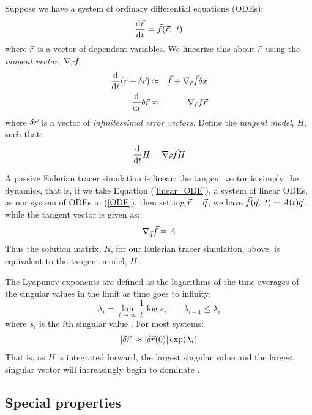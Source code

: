 \documentclass{article}
\begin{document}
Suppose we have a system of ordinary differential equations (ODEs):
\begin{equation}
	\frac{\mathrm d \vec r}{\mathrm d t} = \vec f(\vec r, ~ t)
	\label{ODE}
\end{equation}
where $\vec r$ is a vector of dependent variables.
We linearize this about $\vec r$ using the {\it tangent vector},
$\nabla_{\vec r} f$:
\begin{eqnarray}
\frac{\mathrm d}{\mathrm d t} (\vec r + \delta \vec r) & \approx & \vec f + 
	\nabla_{\vec r} \vec f \delta \vec x \\
	\frac{\mathrm d}{\mathrm d t} \delta \vec r & \approx & \nabla_{\vec r} \vec f \vec r
\end{eqnarray}
where $\delta \vec r$ is a vector of {\it infinitessimal error vectors}.
Define the {\it tangent model}, $H$, such that:
\begin{equation} 
	\frac{\mathrm d}{\mathrm d t} H = \nabla_{\vec r} \vec f H \\
\end{equation}

A passive Eulerian tracer simulation is linear: the tangent vector is simply
the dynamics, that is,
if we take Equation (\ref{linear_ODE}), a system of linear ODEs,
as our system of ODEs in
(\ref{ODE}), then setting $\vec r=\vec q$, 
we have $\vec f(\vec q, ~t)=A(t) \vec q$,
while the tangent vector is given as:
\begin{equation}
	\nabla_{\vec q} \vec f = A
\end{equation}
Thus the solution matrix, $R$, for our Eulerian tracer simulation, above,
is equivalent to the tangent model, $H$.

The Lyapunov exponents are defined as the logarithms of the time averages
of the singular values in the limit as time goes to infinity:
\begin{equation}
\lambda_i = \lim_{t \rightarrow \infty} \frac{1}{t} \log s_i;
~~~~~~~\lambda_{i-1} \le \lambda_i
\end{equation}
where $s_i$ is the $i$th singular value \citep{Ott1993}.
For most systems:
\begin{equation}
|\delta \vec r| \approx |\delta \vec r(0) | \exp(\lambda_i)
\label{lambda1}
\end{equation}
That is, as $H$ is integrated forward, the largest singular value and
the largest singular vector will increasingly begin to dominate
\citep{Ott1993}.

\subsection{Special properties}
\end{document}
